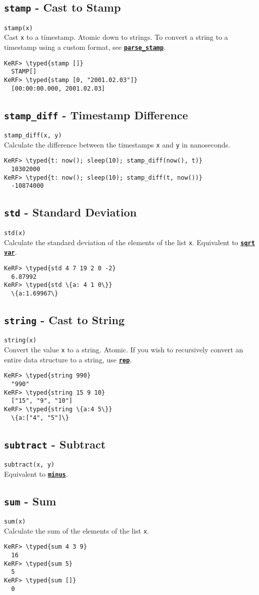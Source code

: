 \documentclass{article}
\newcommand{\typed}[1]{\textcolor{TealBlue}{#1}}
\newcommand{\primdefu}[3]{\subsection{\texttt{#1} - #2}\label{prim:#3}}
\newcommand{\primu}[2]{\hyperref[prim:#2]{\textbf{\texttt{#1}}}}
\newcommand{\primdef}[2]{\primdefu{#1}{#2}{#1}}
\newcommand{\prim}[1]{\primu{#1}{#1}}
\begin{document}
\pagebreak
\primdef{stamp}{Cast to Stamp}
\texttt{stamp(x)}\\

Cast \texttt{x} to a timestamp. Atomic down to strings. To convert a string to a timestamp using a custom format, see \primu{parse\_stamp}{parseStamp}.
\begin{Verbatim}
KeRF> \typed{stamp []}
  STAMP[]
KeRF> \typed{stamp [0, "2001.02.03"]}
  [00:00:00.000, 2001.02.03]
\end{Verbatim}

\primdefu{stamp\_diff}{Timestamp Difference}{stampDiff}
\texttt{stamp\_diff(x, y)}\\

Calculate the difference between the timestamps \texttt{x} and \texttt{y} in nanoseconds.
\begin{Verbatim}
KeRF> \typed{t: now(); sleep(10); stamp_diff(now(), t)}
  10302000
KeRF> \typed{t: now(); sleep(10); stamp_diff(t, now())}
  -10874000
\end{Verbatim}

\primdef{std}{Standard Deviation}
\texttt{std(x)}\\

Calculate the standard deviation of the elements of the list \texttt{x}. Equivalent to \prim{sqrt} \prim{var}.
\begin{Verbatim}
KeRF> \typed{std 4 7 19 2 0 -2}
  6.87992
KeRF> \typed{std \{a: 4 1 0\}}
  \{a:1.69967\}
\end{Verbatim}

\primdef{string}{Cast to String}
\texttt{string(x)}\\

Convert the value \texttt{x} to a string. Atomic. If you wish to recursively convert an entire data structure to a string, use \prim{rep}.
\begin{Verbatim}
KeRF> \typed{string 990}
  "990"
KeRF> \typed{string 15 9 10}
  ["15", "9", "10"]
KeRF> \typed{string \{a:4 5\}}
  \{a:["4", "5"]\}
\end{Verbatim}

\primdef{subtract}{Subtract}
\texttt{subtract(x, y)}\\

Equivalent to \prim{minus}.

\primdef{sum}{Sum}
\texttt{sum(x)}\\

Calculate the sum of the elements of the list \texttt{x}.
\begin{Verbatim}
KeRF> \typed{sum 4 3 9}
  16
KeRF> \typed{sum 5}
  5
KeRF> \typed{sum []}
  0
\end{Verbatim}
\end{document}
